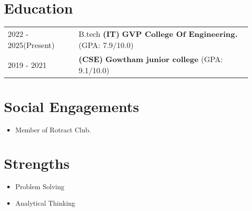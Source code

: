 \documentclass[a4paper,12pt]{article}
\begin{document}
   

\section{Education}
\begin{tabularx}{\linewidth}{@{}l X@{}}

2022 - 2025(Present) & B.tech \textbf{(IT)} \textbf {GVP College Of Engineering.} \hfill  (GPA: 7.9/10.0) \\

2019 - 2021 & \textbf{(CSE)} \textbf {Gowtham junior college} \hfill (GPA: 9.1/10.0) \\
\end{tabularx}

%


\section{Social Engagements}
\begin{minipage}[t]{0.5\textwidth}
    \begin{itemize}
        \item Member of Rotract Club.
    \end{itemize}
\end{minipage}%

\section{Strengths}
\begin{minipage}[t]{0.5\textwidth}
    \begin{itemize}
        \item Problem Solving
    \end{itemize}
\end{minipage}%
\begin{minipage}[t]{0.5\textwidth}
    \begin{itemize}
        \item Analytical Thinking
    \end{itemize}
\end{minipage}
\end{document}
